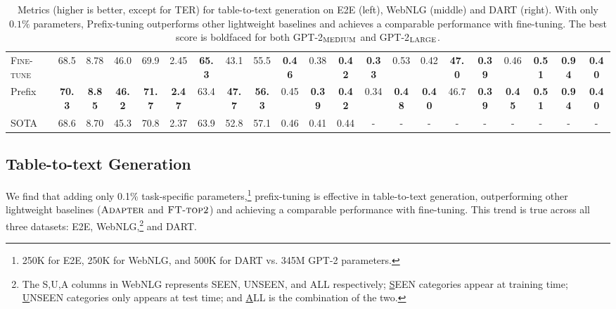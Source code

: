 \documentclass[11pt,a4paper]{article}
\newcommand{\exper}[1]{\textsc{#1}}
\newcommand{\adapter}{\exper{Adapter}}
\newcommand{\FTtop}{\exper{FT-top2}}
\newcommand{\FT}{\exper{Fine-tune}}
\newcommand\pl[1]{\textcolor{red}{[PL: #1]}}
\begin{document}
\begin{table}[]
{\begin{tabular}{lccccc|ccccccccc|cccccc}
\FT       & 68.5 & 8.78 & 46.0 & 69.9 & 2.45 & \textbf{65.3} & 43.1 & 55.5 & \textbf{0.46} & 0.38 & \textbf{0.42} & \textbf{0.33} & 0.53 & 0.42  
& \textbf{47.0} & \textbf{0.39} & 0.46 & \textbf{0.51} & \textbf{0.94} & \textbf{0.40} \\ 
Prefix          & \textbf{70.3}  & \textbf{8.85}  & \textbf{46.2}  & \textbf{71.7}  & \textbf{2.47} & 63.4 & \textbf{47.7} & \textbf{56.3} & 0.45 & \textbf{0.39} & \textbf{0.42} & 0.34 & \textbf{0.48} & \textbf{0.40} 
& 46.7 & \textbf{0.39} & \textbf{0.45} & \textbf{0.51} & \textbf{0.94} & \textbf{0.40} \\
\midrule
SOTA            & 68.6 & 8.70 & 45.3 &70.8 & 2.37  &  63.9 & 52.8 & 57.1 & 0.46 & 0.41 & 0.44 & - & - & - & - & - & - & - & - & - \\

\bottomrule
\end{tabular}
}
\caption{\label{tab:table-to-text} Metrics (higher is better, except for TER) for table-to-text generation on E2E (left), WebNLG (middle) and DART (right). With only $0.1\%$ parameters, Prefix-tuning outperforms other lightweight baselines and achieves a comparable performance  with fine-tuning. The best score is boldfaced for both GPT-2$_{\textsc{MEDIUM}}$ and GPT-2$_{\textsc{LARGE}}$. }
\end{table}

\subsection{Table-to-text Generation}
\label{ssec:table-to-text}

We find that adding only 0.1\% task-specific parameters,\footnote{250K for E2E, 250K for WebNLG, and 500K for DART vs. 345M GPT-2 parameters.}
prefix-tuning is effective in table-to-text generation, outperforming other lightweight baselines ($\adapter$ and $\FTtop$) and achieving a comparable performance with fine-tuning. This trend is true across all three datasets: E2E, WebNLG,\footnote{The S,U,A columns in WebNLG represents SEEN, UNSEEN, and ALL respectively; \underline{S}EEN categories appear at training time; \underline{U}NSEEN categories only appears at test time; and \underline{A}LL is the combination of the two.} and DART.
\end{document}
